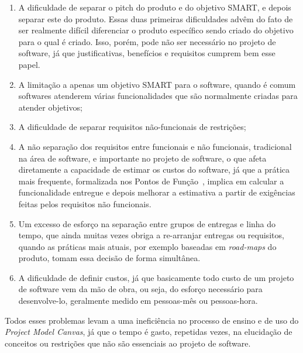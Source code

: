 \documentclass[fontsize=12pt, a4paper,pagesize=auto,toc=listof, ,twoside,chapterprefix=false,appendixprefix=true,open=right]{scrbook}
\begin{document}
\begin{enumerate}
    \item A dificuldade de separar o pitch do produto e do objetivo SMART, e depois separar este do produto. Essas duas primeiras dificuldades advêm do fato de ser realmente difícil diferenciar o produto específico sendo criado do objetivo para o qual é criado. Isso, porém, pode não ser necessário no projeto de software, já que justificativas, benefícios e requisitos cumprem bem esse papel.
    \item A limitação a apenas um objetivo SMART para o software, quando é comum softwares atenderem várias funcionalidades que são normalmente criadas para atender objetivos;
    \item A dificuldade de separar requisitos não-funcionais de restrições;
    \item A não separação dos requisitos entre funcionais e não funcionais, tradicional na área de software, e importante no projeto de software, o que afeta diretamente a capacidade de estimar os custos do software, já que a prática mais frequente, formalizada nos Pontos de Função~\citep{ifpug:guide:2012}, implica em calcular a funcionalidade entregue e depois melhorar a estimativa a partir de exigências feitas pelos requisitos não funcionais.
    \item Um excesso de esforço na separação entre grupos de entregas e linha do tempo, que ainda muitas vezes obriga a re-arranjar entregas ou requisitos, quando as práticas mais atuais, por exemplo baseadas em \textit{road-maps} do produto, tomam essa decisão de forma simultânea.
    \item \label{problems:total} A dificuldade de definir custos, já que basicamente todo custo de um projeto de software vem da mão de obra, ou seja, do esforço necessário para desenvolve-lo, geralmente medido em pessoas-mês ou pessoas-hora.
\end{enumerate}

Todos esses problemas levam a uma ineficiência no processo de ensino e de uso do \textit{Project Model Canvas}, já que o tempo é gasto, repetidas vezes, na elucidação de conceitos ou restrições que não são essenciais ao projeto de software.
\end{document}
